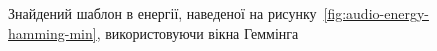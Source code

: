 \begin{figure}[!h]

            \caption{Знайдений шаблон в енергії, наведеної на рисунку~\ref{fig:audio-energy-hamming-min}, використовуючи
                вікна Геммінга}
            \label{fig:matched-energy-hamming-min-hamming}
        \end{figure}

